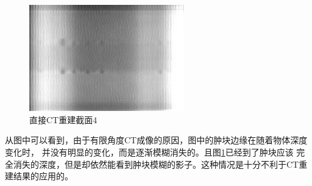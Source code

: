\begin{figure}[!ht]
\center
\includegraphics[width=0.6\textwidth]{figure/result/origin4.jpg}
\caption{直接CT重建截面4}\label{fig:origin4}
\end{figure}

从图中可以看到，由于有限角度CT成像的原因，图中的肿块边缘在随着物体深度变化时，
并没有明显的变化，而是逐渐模糊消失的。且图\ref{fig:origin4}已经到了肿块应该
完全消失的深度，但是却依然能看到肿块模糊的影子。这种情况是十分不利于CT重建结果的应用的。


